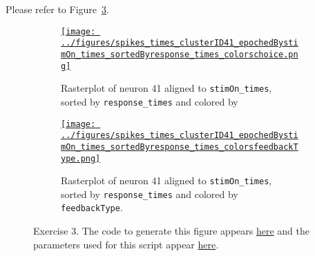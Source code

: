 \documentclass{article}
\begin{document}
Please refer to Figure~\ref{fig:ex2}.

\begin{figure}
    \begin{center}

        \begin{subfigure}{1.0\textwidth}
            \centering
            \href{https://www.gatsby.ucl.ac.uk/~rapela/neuroinformatics/2023/ws1/figures/spikes_times_clusterID41_epochedBystimOn_times_sortedByresponse_times_colorschoice.html}{\texttt{[image: ../figures/spikes\_times\_clusterID41\_epochedBystimOn\_times\_sortedByresponse\_times\_colorschoice.png]}}

            \caption{Rasterplot of neuron 41 aligned to
            \texttt{stimOn\_times},
            sorted by
            \texttt{response\_times}
            and colored by
            }

            \label{fig:ex3_1}
        \end{subfigure}

        \begin{subfigure}{1.0\textwidth}
            \centering
            \href{https://www.gatsby.ucl.ac.uk/~rapela/neuroinformatics/2023/ws1/figures/spikes_times_clusterID41_epochedBystimOn_times_sortedByresponse_times_colorsfeedbackType.html}{\texttt{[image: ../figures/spikes\_times\_clusterID41\_epochedBystimOn\_times\_sortedByresponse\_times\_colorsfeedbackType.png]}}

            \caption{Rasterplot of neuron 41 aligned to
            \texttt{stimOn\_times},
            sorted by
            \texttt{response\_times}
            and colored by
            \texttt{feedbackType}.
            }

            \label{fig:ex3_2}
        \end{subfigure}

        \caption{Exercise 3. The code to generate this figure appears
        \href{https://github.com/joacorapela/neuroinformatics23/blob/master/worksheets/ws1/mySolution/code/scripts/doPlotEpochedSpikesTimes.py}{here}
        and the parameters used for this script appear
        \href{https://github.com/joacorapela/neuroinformatics23/blob/master/worksheets/ws1/mySolution/code/scripts/doPlotEpochedSpikesTimes.csh}{here}.
        }

        \label{fig:ex2}


    \end{center}
\end{figure}
\end{document}
